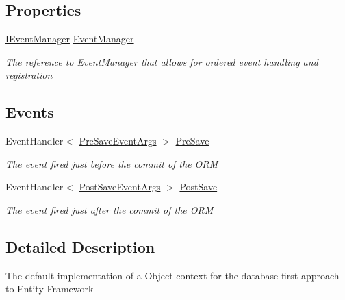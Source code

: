\subsection*{Properties}
\begin{DoxyCompactItemize}
\item 
\hyperlink{interface_highway_1_1_data_1_1_interfaces_1_1_i_event_manager}{I\-Event\-Manager} \hyperlink{class_highway_1_1_data_1_1_entity_framework_1_1_contexts_1_1_entity_framework_object_context_a2342a28fa33d6cae0ce58c5f74438e9a}{Event\-Manager}
\begin{DoxyCompactList}\small\item\em The reference to Event\-Manager that allows for ordered event handling and registration \end{DoxyCompactList}\end{DoxyCompactItemize}
\subsection*{Events}
\begin{DoxyCompactItemize}
\item 
Event\-Handler$<$ \hyperlink{class_highway_1_1_data_1_1_interceptors_1_1_events_1_1_pre_save_event_args}{Pre\-Save\-Event\-Args} $>$ \hyperlink{class_highway_1_1_data_1_1_entity_framework_1_1_contexts_1_1_entity_framework_object_context_a0c33a6b51babf17fcc2d61e396dd8bf9}{Pre\-Save}
\begin{DoxyCompactList}\small\item\em The event fired just before the commit of the O\-R\-M \end{DoxyCompactList}\item 
Event\-Handler$<$ \hyperlink{class_highway_1_1_data_1_1_interceptors_1_1_events_1_1_post_save_event_args}{Post\-Save\-Event\-Args} $>$ \hyperlink{class_highway_1_1_data_1_1_entity_framework_1_1_contexts_1_1_entity_framework_object_context_ad5a527da395401a50839ae936576b9d9}{Post\-Save}
\begin{DoxyCompactList}\small\item\em The event fired just after the commit of the O\-R\-M \end{DoxyCompactList}\end{DoxyCompactItemize}


\subsection{Detailed Description}
The default implementation of a Object context for the database first approach to Entity Framework 



